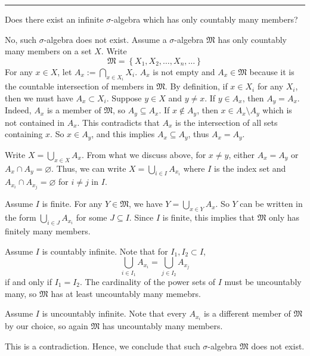 \documentclass[letterpaper, 12pt]{article}
\begin{document}
\noindent\rule{7in}{2.8pt}
\begin{problem}{1.1}
Does there exist an infinite \(\sigma\)-algebra which has only countably many members?
\end{problem}
\begin{solution}
No, such \(\sigma\)-algebra does not exist. Assume a \(\sigma\)-algebra \(\mathfrak{M}\) has only countably many members on a set \(X\). Write 
\[\mathfrak{M}=\left\{ X_1,X_2,\ldots,X_n,\ldots \right\}\]
For any \(x\in X\), let \(A_x:=\bigcap_{x\in X_i}X_i\). \(A_x\) is not empty and \(A_x\in \mathfrak{M}\) because it is the countable intersection of members in \(\mathfrak{M}\). By definition, if \(x\in X_i\) for any \(X_i\), then we must have \(A_x\subset X_i\). Suppose \(y\in X\) and \(y\neq x\). If \(y\in A_x\), then \(A_y=A_x\). Indeed, \(A_x\) is a member of \(\mathfrak{M}\), so \(A_y\subseteq A_x\). If \(x\notin A_y\), then \(x\in A_x\setminus A_y\) which is not contained in \(A_x\). This contradicts that \(A_x\) is the intersection of all sets containing \(x\). So \(x\in A_y\), and this implies \(A_x\subseteq A_y\), thus \(A_x=A_y\). 

Write \(X=\bigcup_{x\in X}A_x\). From what we discuss above, for \(x\neq y\), either \(A_x=A_y\) or \(A_x\cap A_y=\varnothing\). Thus, we can write \(X=\bigcup_{i\in I}A_{x_i}\) where \(I\) is the index set and \(A_{x_i}\cap A_{x_j}=\varnothing\) for \(i\neq j\) in \(I\). 

Assume \(I\) is finite. For any \(Y\in \mathfrak{M}\), we have \(Y=\bigcup_{x\in Y}A_x\). So \(Y\) can be written in the form \(\bigcup_{i\in J}A_{x_i}\) for some \(J\subseteq I\). Since \(I\) is finite, this implies that \(\mathfrak{M}\) only has finitely many members.

Assume \(I\) is countably infinite. Note that for \(I_1,I_2\subset I\),
\[\bigcup_{i\in I_1}A_{x_i}=\bigcup_{j\in I_2}A_{x_j}\]
if and only if \(I_1=I_2\). The cardinality of the power sets of \(I\) must be uncountably many, so \(\mathfrak{M}\) has at least uncountably many memebrs. 

Assume \(I\) is uncountably infinite. Note that every \(A_{x_i}\) is a different member of \(\mathfrak{M}\) by our choice, so again \(\mathfrak{M}\) has uncountably many members. 

This is a contradiction. Hence, we conclude that such \(\sigma\)-algebra \(\mathfrak{M}\) does not exist. 

\end{solution}
\end{document}
